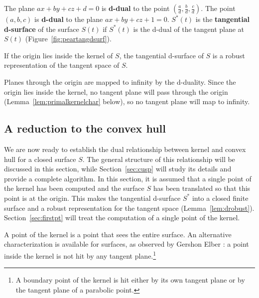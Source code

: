 \documentclass[12pt]{article}
\begin{document}
\begin{defn2}
The plane $ax+by+cz+d=0$ is {\bf d-dual} to the point $(\frac{a}{d},\frac{b}{d},\frac{c}{d})$.
The point $(a,b,c)$ is {\bf d-dual} to the plane $ax+by+cz+1=0$.
$S^*(t)$ is the {\bf tangential d-surface} of the surface $S(t)$ if $S^*(t)$ is the d-dual
of the tangent plane at $S(t)$ (Figure~\ref{fig:peartangdsurf}).
\end{defn2}

\begin{lemma}
\label{lem:drobust}
If the origin lies inside the kernel of $S$,
the tangential d-surface of $S$ is a robust representation of the tangent space of $S$.
\end{lemma}
\prf
Planes through the origin are mapped to infinity by the d-duality.
Since the origin lies inside the kernel,
no tangent plane will pass through the origin (Lemma~\ref{lem:primalkernelchar} below), 
so no tangent plane will map to infinity.
\QED


\subsection{A reduction to the convex hull}
\label{sec:reduction}

We are now ready to establish the dual relationship between kernel and convex hull
for a closed surface $S$.
The general structure of this relationship will be discussed in this section,
while Section~\ref{sec:cusp} will study its details and provide a complete algorithm.
In this section, it is assumed that a single point of the kernel has been computed and the surface $S$
has been translated so that this point is at the origin.
This makes the tangential d-surface $S^*$ into a closed finite surface
and a robust representation for the tangent space (Lemma~\ref{lem:drobust}).
Section~\ref{sec:firstpt} will treat the computation of a single point of the kernel.

A point of the kernel is a point that sees the entire surface.
An alternative characterization is available for surfaces,
as observed by Gershon Elber \cite{elber02}:
a point inside the kernel is not hit by any tangent plane.\footnote{A boundary point
	of the kernel is hit either by its own tangent plane or by the tangent plane 
	of a parabolic point.}
\end{document}
